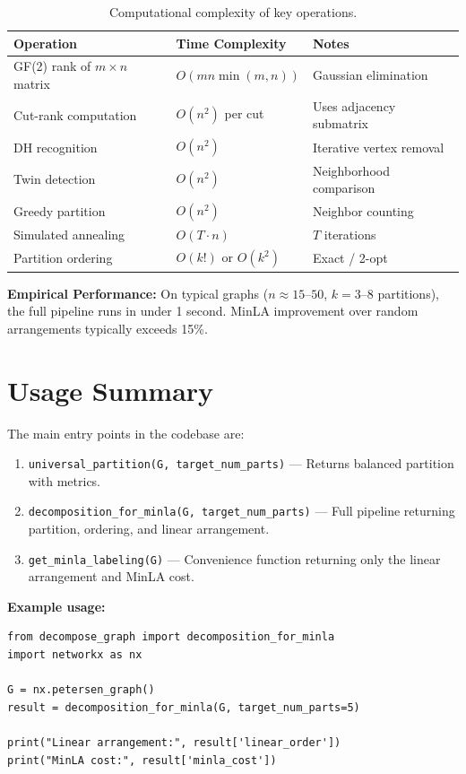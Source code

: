 \documentclass[11pt,a4paper]{article}
\theoremstyle{definition}
\theoremstyle{plain}
\theoremstyle{remark}
\begin{document}
\begin{table}[h]
\centering
\begin{tabular}{lll}
\toprule
\textbf{Operation} & \textbf{Time Complexity} & \textbf{Notes} \\
\midrule
GF(2) rank of $m \times n$ matrix & $O(mn \min(m,n))$ & Gaussian elimination \\
Cut-rank computation & $O(n^2)$ per cut & Uses adjacency submatrix \\
DH recognition & $O(n^2)$ & Iterative vertex removal \\
Twin detection & $O(n^2)$ & Neighborhood comparison \\
Greedy partition & $O(n^2)$ & Neighbor counting \\
Simulated annealing & $O(T \cdot n)$ & $T$ iterations \\
Partition ordering & $O(k!)$ or $O(k^2)$ & Exact / 2-opt \\
\bottomrule
\end{tabular}
\caption{Computational complexity of key operations.}
\end{table}

\textbf{Empirical Performance:} On typical graphs ($n \approx 15$--$50$,
$k = 3$--$8$ partitions), the full pipeline runs in under 1 second.
MinLA improvement over random arrangements typically exceeds 15\%.

\section{Usage Summary}

The main entry points in the codebase are:

\begin{enumerate}
  \item \texttt{universal\_partition(G, target\_num\_parts)} --- Returns
        balanced partition with metrics.
  \item \texttt{decomposition\_for\_minla(G, target\_num\_parts)} --- Full
        pipeline returning partition, ordering, and linear arrangement.
  \item \texttt{get\_minla\_labeling(G)} --- Convenience function returning
        only the linear arrangement and MinLA cost.
\end{enumerate}

\textbf{Example usage:}
\begin{verbatim}
from decompose_graph import decomposition_for_minla
import networkx as nx

G = nx.petersen_graph()
result = decomposition_for_minla(G, target_num_parts=5)

print("Linear arrangement:", result['linear_order'])
print("MinLA cost:", result['minla_cost'])
\end{verbatim}
\end{document}
